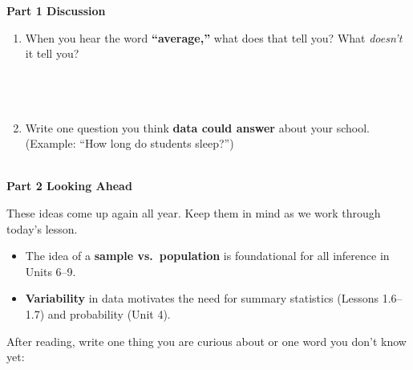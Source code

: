 \documentclass[10pt]{article}
\begin{document}
\namedateperiod

\vspace{0.3in}

{\large\bfseries\color{navy} Part 1 \quad Discussion}

\vspace{0.12in}

\begin{enumerate}

    \item When you hear the word \textbf{``average,''} what does that tell you?
    What \textit{doesn't} it tell you?\\[10pt]
    \writeline\\[2pt]\writeline\\[2pt]\writeline\\[2pt]\writeline

    \item Write one question you think \textbf{data could answer} about your school.
    (Example: ``How long do students sleep?'')\\[10pt]
    \writeline\\[2pt]\writeline

\end{enumerate}

\vspace{0.35in}

{\large\bfseries\color{navy} Part 2 \quad Looking Ahead}

\vspace{0.12in}

\noindent These ideas come up again all year. Keep them in mind as we work through today's lesson.

\vspace{0.14in}

\begin{tcolorbox}[colback=greenbg, colframe=greenacc, boxrule=0.8pt, arc=2mm,
    left=4mm, right=4mm, top=3mm, bottom=3mm]
    \small
    \begin{itemize}[leftmargin=1.3em, itemsep=8pt]
  \item The idea of a \textbf{sample vs.\ population} is foundational for all
  inference in Units 6--9.
  \item \textbf{Variability} in data motivates the need for summary statistics
  (Lessons 1.6--1.7) and probability (Unit 4).
    \end{itemize}
\end{tcolorbox}

\vspace{0.2in}

\noindent\textcolor{slate}{\small After reading, write one thing you are curious about or one word you
don't know yet:}\\[8pt]
\writeline\\[2pt]\writeline
\end{document}
